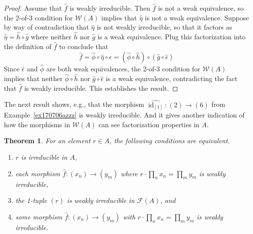 \documentclass[reqno]{amsart}
\theoremstyle{plain}
\newtheorem{thm}[lem]{Theorem}
\theoremstyle{definition}
\newcommand{\cat}[1]{\mathcal{#1}}
\newcommand{\catw}{\cat{W}}
\newcommand{\id}{\operatorname{id}}
\numberwithin{equation}{lem}
\begin{document}
\begin{proof}
Assume that $\hat f$ is weakly irreducible.
Then $\hat f$ is not a weak equivalence, so the 2-of-3 condition for $\catw(A)$ implies that $\hat\eta$
is not a weak equivalence.
Suppose by way of contradiction that $\hat\eta$ is not weakly irreducible, so that it factors as
$\hat\eta=\hat h\circ\hat g$  where neither $\hat h$ nor $\hat g$ is a weak equivalence. 
Plug this factorization into the definition of $\hat f$ to conclude that
$$\hat f
=\hat\phi\circ\hat\eta
\circ\hat\epsilon
=(\hat\phi\circ
\hat h)\circ(\hat g\circ\hat\epsilon)
$$
Since $\hat\epsilon$ and $\hat\phi$ are both weak equivalences, 
the 2-of-3 condition for $\catw(A)$ implies that neither $\hat\phi\circ
\hat h$ nor $\hat g\circ\hat\epsilon$ is a weak equivalence, contradicting the fact that $\hat f$ is weakly irreducible.
This establishes the result.
\end{proof}

The next result shows, e.g., that the morphism $\widehat{\id_{[1]}}\colon(2)\to(6)$ from
Example~\ref{ex170706azzz}
is weakly irreducible.
And it gives another indication of how the morphisms in $\catw(A)$ can see factorization properties in $A$.

\begin{thm}\label{lem170501a} 
For an element $r \in A$, the following conditions are equivalent.
\begin{enumerate}[\rm(i)]
\item \label{lem170501a1}
$r$
is irreducible in $A$,
\item \label{lem170501a5}
each morphism $\hat f\colon (x_n)\to (y_m)$ where $r\cdot\prod_nx_n=\prod_my_m$ is weakly irreducible,
\item \label{lem170501a2} the 1-tuple
$(r)$
is 
weakly
irreducible in $\mathcal{F}(A)$, 
and
\item \label{lem170501a0}
some morphism $\hat f\colon (x_n)\to (y_m)$ with $r\cdot\prod_nx_n=\prod_my_m$ is weakly irreducible.
\end{enumerate}
\end{thm}
\end{document}
